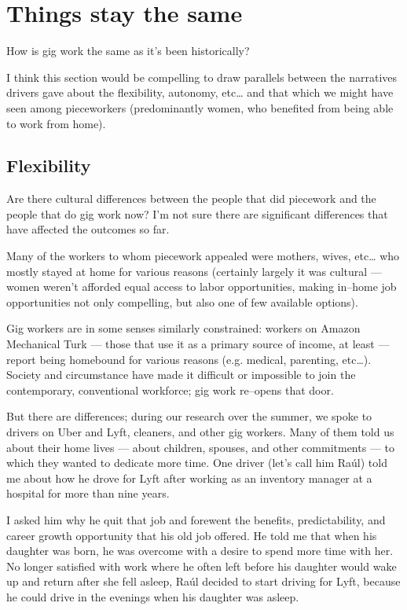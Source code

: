 \documentclass{sigchi}
\begin{document}
\section{Things stay the same}
How is gig work the same as it's been historically?

I think this section would be compelling to draw parallels between
the narratives drivers gave about the flexibility, autonomy, etc\dots
and that which we might have seen among pieceworkers
(predominantly women, who benefited from being able to work from home).

\subsection{Flexibility}
Are there cultural differences between the people that did piecework and
the people that do gig work now?
I'm not sure there are significant differences that have affected the outcomes so far.

Many of the workers to whom piecework appealed were mothers, wives, etc\dots
who mostly stayed at home for various reasons
(certainly largely it was cultural
--- women weren't afforded equal access to labor opportunities,
making in--home job opportunities not only compelling, but also one of few available options).

Gig workers are in some senses similarly constrained:
workers on Amazon Mechanical Turk
--- those that use it as a primary source of income, at least ---
report being homebound for various reasons (e.g. medical, parenting, etc\dots).
Society and circumstance have made it difficult
or impossible
to join the contemporary, conventional workforce;
gig work re--opens that door.

But there are differences; during our research over the summer,
we spoke to drivers on Uber and Lyft, cleaners, and other gig workers.
Many of them told us about their home lives
--- about children, spouses, and other commitments ---
to which they wanted to dedicate more time.
One driver
(let's call him Ra\'{u}l)
told me about how he drove for Lyft
after working as an inventory manager at a hospital for more than nine years.

I asked him why he quit that job and forewent
the benefits,
predictability,
and career growth opportunity
that his old job offered.
He told me that when his daughter was born,
he was overcome with a desire to spend more time with her.
No longer satisfied with work
where he often left before his daughter would wake up and return after she fell asleep,
Ra\'{u}l decided to start driving for Lyft,
because he could drive in the evenings when his daughter was asleep.
\end{document}

